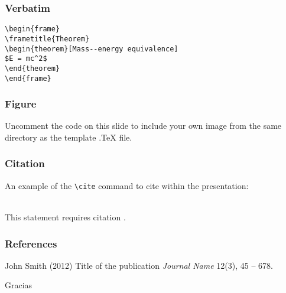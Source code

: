 \documentclass{beamer}
\begin{document}

\begin{frame}[fragile] %
\frametitle{Verbatim}
\begin{example}
\begin{verbatim}
\begin{frame}
\frametitle{Theorem}
\begin{theorem}[Mass--energy equivalence]
$E = mc^2$
\end{theorem}
\end{frame}\end{verbatim}
\end{example}
\end{frame}


\begin{frame}
\frametitle{Figure}
Uncomment the code on this slide to include your own image from the same directory as the template .TeX file.
\end{frame}


\begin{frame}[fragile] %
\frametitle{Citation}
An example of the \verb|\cite| command to cite within the presentation:\\~

This statement requires citation \cite{p1}.
\end{frame}


\begin{frame}
\frametitle{References}
\footnotesize{
\begin{thebibliography}{99} %
 John Smith (2012)
\newblock Title of the publication
\newblock \emph{Journal Name} 12(3), 45 -- 678.
\end{thebibliography}
}
\end{frame}


\begin{frame}
\Huge{\centerline{Gracias}}
\end{frame}

\end{document}
